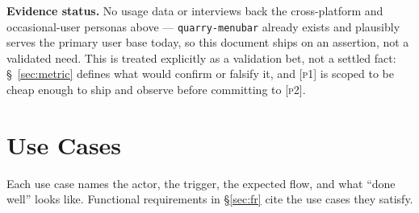 \documentclass[a4paper,11pt]{report}
\newcommand{\pone}{\textsc{[p1]}}
\newcommand{\ptwo}{\textsc{[p2]}}
\begin{document}
\textbf{Evidence status.} No usage data or interviews back the
cross-platform and occasional-user personas above --- \texttt{quarry-menubar}
already exists and plausibly serves the primary user base today, so this
document ships on an assertion, not a validated need. This is treated
explicitly as a validation bet, not a settled fact: \S~\ref{sec:metric}
defines what would confirm or falsify it, and \pone{} is scoped to be
cheap enough to ship and observe before committing to \ptwo{}.

\section{Use Cases}

Each use case names the actor, the trigger, the expected flow, and what
``done well'' looks like. Functional requirements in \S\ref{sec:fr} cite
the use cases they satisfy.
\end{document}

